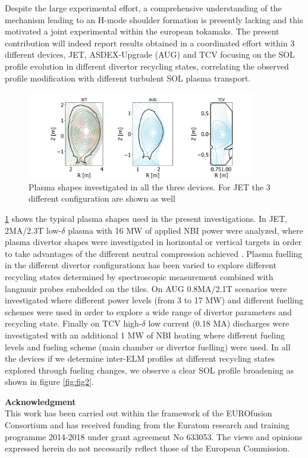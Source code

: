 \documentclass[12pt, a4paper, twoside]{article}
\begin{document}
Despite the
large experimental effort, a comprehensive understanding
of the mechanism leading to an H-mode shoulder formation is presently
lacking and this motivated a joint experimental within the european tokamaks.
The present contribution will indeed report results obtained in a
coordinated effort within 3 different devices, JET, ASDEX-Upgrade (AUG) and
TCV focusing on the SOL profile evolution in different divertor recycling
states, correlating the observed profile modification with different turbulent SOL
plasma transport.
\begin{figure}
\centering
\includegraphics[width=100mm]{../pdfbox/AllEquilibria.pdf}
\caption{Plasma shapes investigated in all the three devices. For JET
  the 3 different configuration are shown as well}
\vspace{-2.6ex}
\label{fig:fig1}
\end{figure}
\ref{fig:fig1} shows the typical plasma shapes used in the present
investigations.
In JET, 2MA/2.3T low-$\delta$ plasma with 16 MW of
applied NBI power were analyzed, where plasma divertor shapes
were investigated in horizontal or vertical targets in order to take
advantages of the different neutral compression achieved
\cite{Tamain:2015cx}. Plasma fuelling in the different divertor
configurationx has been varied to explore different recycling states
determined by spectroscopic measurement combined with langmuir probes
embedded on the tiles. On AUG 0.8MA/2.1T scenarios were investigated
where different power levels (from 3 to 17 MW) and different fuelling
schemes were used in order to explore a wide range of divertor
parameters and recycling state. Finally on TCV high-$\delta$ low current (0.18 MA)
discharges were investigated with an additional 1 MW of NBI heating
where different fueling levels and fueling scheme (main chamber or
divertor fuelling) were used. In all the devices if we determine
inter-ELM profiles at different recycling states explored through
fueling changes, we observe a clear SOL profile broadening as shown in
figure \ref{fig:fig2}.


\begingroup
{}
{\footnotesize\textbf{Acknowledgment}\\
This work has been carried out within the framework of the EUROfusion Consortium and has received funding from the Euratom
research and training programme 2014-2018 under grant agreement No 633053. The views and opinions expressed herein do not
necessarily reflect those of the European Commission.}
\begin{multicols}{2}
\setlength\bibitemsep{0pt}
\printbibliography[heading=none]
\end{multicols}
\endgroup
\end{document}
